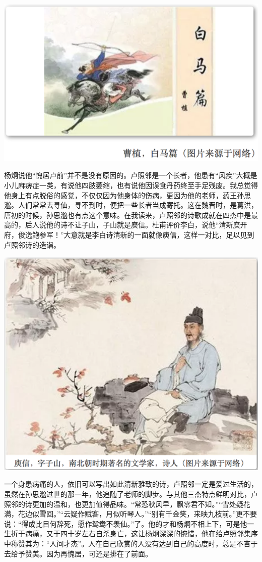 \documentclass[
]{book}
\begin{document}
\includegraphics[width=8.33in]{images/ctsj2}

杨炯说他``愧居卢前''并不是没有原因的。卢照邻是一个长者，他患有``风疾''大概是小儿麻痹症一类，有说他四肢萎缩，也有说他因误食丹药终至手足残废。我总觉得他身上有点脱俗的感觉，不仅仅因为他身体的伤病，更因为他的老师，药王孙思邈。人们常常去寻仙，寻不到时，便把一些长者当成寄托。这在魏晋时，是葛洪，唐初的时候，孙思邈也有点这个意味。在我读来，卢照邻的诗歌成就在四杰中是最高的，后人说他的诗不让子山，子山就是庾信。杜甫评价李白，说他``清新庾开府，俊逸鲍参军！''大意就是李白诗清新的一面就像庾信，这样一对比，足以见到卢照邻诗的造诣。

\includegraphics[width=8.33in]{images/ctsj3}

一个身患病痛的人，依旧可以写出如此清新雅致的诗，卢照邻一定是爱过生活的，虽然在孙思邈过世的那一年，他追随了老师的脚步。与其他三杰特点鲜明对比，卢照邻的诗更加的温和，也更加值得品味。``常恐秋风早，飘零君不知。''``雪处疑花满，花边似雪回。''``云疑作赋客，月似听琴人。''``别有千金笑，来映九枝前。''更不要说：``得成比目何辞死，愿作鸳鸯不羡仙。''了。他的才和杨炯不相上下，可是他一生折于病痛，又于四十岁左右自杀身亡，这让杨炯深深的惋惜，他在给卢照邻集序中称赞其为：``人间才杰''。人在自己欣赏的人没有达到自己的高度时，总是不吝于去给予赞美。因为再愧居，可还是排在了前面。
\end{document}
